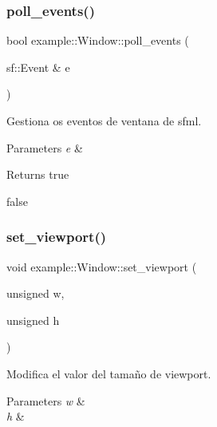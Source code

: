 \mbox{\label{classexample_1_1_window_abebfb01402035477a536d3fae1bed660}} 
\subsubsection{\texorpdfstring{poll\_events()}{poll\_events()}}
{\footnotesize\ttfamily bool example\+::\+Window\+::poll\+\_\+events (\begin{DoxyParamCaption}\item[{sf\+::\+Event \&}]{e }\end{DoxyParamCaption})\hspace{0.3cm}{\ttfamily [inline]}}



Gestiona os eventos de ventana de sfml. 


\begin{DoxyParams}{Parameters}
{\em e} & \\
\hline
\end{DoxyParams}
\begin{DoxyReturn}{Returns}
true 

false 
\end{DoxyReturn}
\mbox{\label{classexample_1_1_window_a1b6b6b9cfb24fb32a0f2db4b7d7ba798}} 
\subsubsection{\texorpdfstring{set\_viewport()}{set\_viewport()}}
{\footnotesize\ttfamily void example\+::\+Window\+::set\+\_\+viewport (\begin{DoxyParamCaption}\item[{unsigned}]{w,  }\item[{unsigned}]{h }\end{DoxyParamCaption})}



Modifica el valor del tamaño de viewport. 


\begin{DoxyParams}{Parameters}
{\em w} & \\
\hline
{\em h} & \\
\hline
\end{DoxyParams}
\mbox{\label{classexample_1_1_window_a3f27b4a057e3d4219335cce4edc669fe}} 
